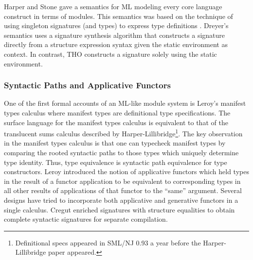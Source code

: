 Harper and Stone \cite{harperstone} gave a semantics for ML modeling
every core language construct in terms of modules. This semantics was
based on the technique of using singleton signatures (and types) to
express type definitions \cite{stone00}. Dreyer's semantics uses a signature synthesis algorithm that
constructs a signature directly from a structure expression syntax
given the static environment as context. In
contrast, THO constructs a signature solely using the static environment. 




\subsubsection{Syntactic Paths and Applicative Functors}
One of the first formal accounts of an ML-like module system is Leroy's manifest types calculus \cite{leroy94} where manifest types are definitional type specifications. The surface language for the manifest types calculus is equivalent to that of the translucent sums calculus described by Harper-Lillibridge\footnote{Definitional specs appeared in SML/NJ 0.93 a year before the Harper-Lillibridge paper appeared.}. The key observation in the manifest types calculus is that one can typecheck manifest types by comparing the rooted syntactic paths to those types which uniquely determine type identity. Thus, type equivalence is syntactic path equivalence for type constructors.  Leroy introduced the notion of applicative functors \cite{leroy95} which held types in the result of a functor application to be equivalent to corresponding types in all other results of applications of that functor to the ``same'' argument. Several designs \cite{shao99,dhc03,russothesis} have tried to incorporate both applicative and generative functors in a single calculus. Cregut \cite{CregutMacQueen94} enriched signatures with structure equalities to obtain complete syntactic signatures for separate compilation.

